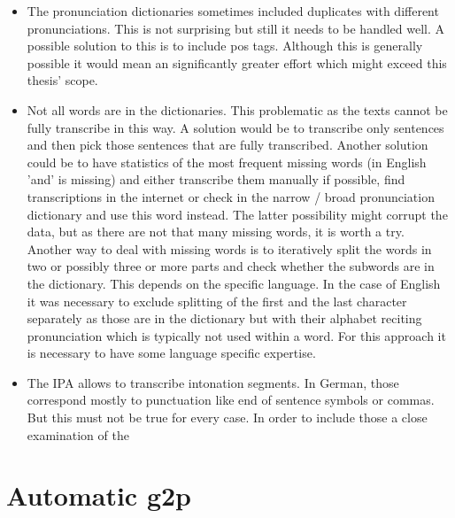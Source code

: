 \begin{itemize}
\item The pronunciation dictionaries sometimes included duplicates with different pronunciations. This is not surprising but still it needs to be handled well. A possible solution to this is to include \ac{pos} tags. Although this is generally possible it would  mean an significantly greater effort which might exceed this thesis' scope. 
\item Not all words are in the dictionaries. This problematic as the texts cannot be fully transcribe in this way. A solution would be to transcribe only sentences and then pick those sentences that are fully transcribed. Another solution could be to have statistics of the most frequent missing words (in English 'and' is missing) and either transcribe them manually if possible, find transcriptions in the internet or check in the narrow / broad pronunciation dictionary and use this word instead. The latter possibility might corrupt the data, but as there are not that many missing words, it is worth a try.
Another way to deal with missing words is to iteratively split the words in two or possibly three or more parts and check whether the subwords are in the dictionary. This depends on the specific language. In the case of English it was necessary to exclude splitting of the first and the last character separately as those are in the dictionary but with their alphabet reciting pronunciation which is typically not used within a word. For this approach it is necessary to have some language specific expertise.
\item The IPA allows to transcribe intonation segments. In German, those correspond mostly to punctuation like end of sentence symbols or commas. But this must not be true for every case. In order to include those a close examination of the 
\end{itemize}



\section{Automatic \ac{g2p}}
